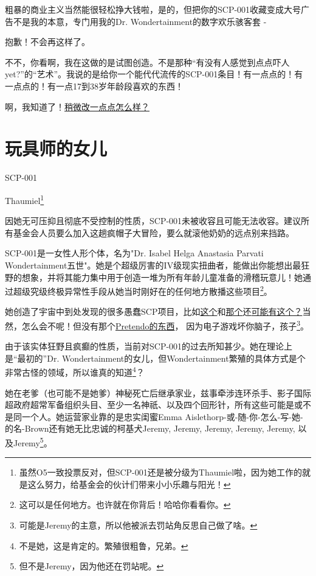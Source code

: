 粗暴的商业主义当然能很轻松挣大钱啦，是的，但把你的SCP-001收藏变成大号广告不是我的本意，专门用我的Dr. Wondertainment的数字欢乐骇客套 -

抱歉！不会再这样了。

不不，你看啊，我在这做的是试图创造。不是那种“有没有人感觉到点点吓人yet?”的“艺术”。我说的是给你一个能代代流传的SCP-001条目！有一点点的！有一点点的！有一点17到38岁年龄段喜欢的东西！

啊，我知道了！\hyperref[sec:SCP-001.a.simple.toymaker.offset.3]{稍微改一点点怎么样？}

\newpage

\section{玩具师的女儿}

\label{sec:SCP-001.a.simple.toymaker.offset.3}

SCP-001

 Thaumiel\footnote{虽然O5一致投票反对，但SCP-001还是被分级为Thaumiel啦，因为她工作的就是这么努力，给基金会的伙计们带来小小乐趣与阳光！}

因她无可压抑且彻底不受控制的性质，SCP-001未被收容且可能无法收容。建议所有基金会人员要么加入这趟疯帽子大冒险，要么就滚他奶奶的远点别来挡路。

SCP-001是一女性人形个体，名为"Dr. Isabel Helga Anastasia Parvati Wondertainment五世"。她是个超级厉害的IV级现实扭曲者，能做出你能想出最狂野的想象，并将其能力集中用于创造一堆为所有年龄儿童准备的滑稽玩意儿！她通过超级究级终极异常性手段从她当时刚好在的任何地方散播这些项目\footnote{这可以是任何地方。也许就在你背后！哈哈你看看你。}。

她创造了宇宙中到处发现的很多愚蠢SCP项目，比如\hyperref[chap:SCP-2320]{这个}和\hyperref[chap:SCP-2514]{那个}还\hyperref[chap:SCP-3551]{可能有这个？}当然，怎么会不呢！但没有那个\hyperref[chap:SCP-591]{Pretendo的东西}， 因为电子游戏坏你脑子，孩子\footnote{可能是Jeremy的主意，所以他被派去罚站角反思自己做了啥。}。

由于该实体狂野且疯癫的性质，当前对SCP-001的过去所知甚少。她在理论上是“最初的”Dr. Wondertainment的女儿，但Wondertainment繁殖的具体方式是个非常古怪的领域，所以谁真的知道\footnote{不是她，这是肯定的。繁殖很粗鲁，兄弟。}？

她在老爹（也可能不是她爹）神秘死亡后继承家业，兹事牵涉连环杀手、影子国际超政府超常军备组织头目、至少一名神祇、以及四个回形针，所有这些可能是或不是同一个人。她运营家业靠的是忠实闺蜜Emma Aislethorp-或-随-你-怎么-写-她-的名-Brown还有她无比忠诚的柯基犬Jeremy, Jeremy, Jeremy, Jeremy, Jeremy, 以及Jeremy\footnote{但不是Jeremy，因为他还在罚站呢。}。

